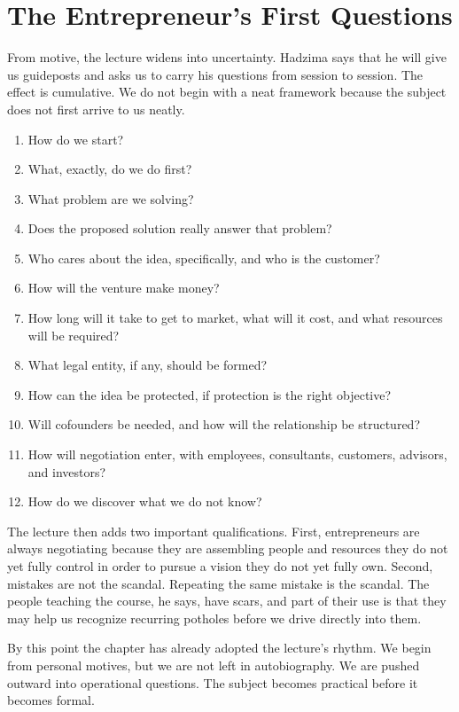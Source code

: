 \section{The Entrepreneur's First Questions}

From motive, the lecture widens into uncertainty. Hadzima says that he will give us guideposts and asks us to carry his questions from session to session. The effect is cumulative. We do not begin with a neat framework because the subject does not first arrive to us neatly.

\begin{enumerate}
  \item How do we start?
  \item What, exactly, do we do first?
  \item What problem are we solving?
  \item Does the proposed solution really answer that problem?
  \item Who cares about the idea, specifically, and who is the customer?
  \item How will the venture make money?
  \item How long will it take to get to market, what will it cost, and what resources will be required?
  \item What legal entity, if any, should be formed?
  \item How can the idea be protected, if protection is the right objective?
  \item Will cofounders be needed, and how will the relationship be structured?
  \item How will negotiation enter, with employees, consultants, customers, advisors, and investors?
  \item How do we discover what we do not know?
\end{enumerate}

The lecture then adds two important qualifications. First, entrepreneurs are always negotiating because they are assembling people and resources they do not yet fully control in order to pursue a vision they do not yet fully own. Second, mistakes are not the scandal. Repeating the same mistake is the scandal. The people teaching the course, he says, have scars, and part of their use is that they may help us recognize recurring potholes before we drive directly into them.

By this point the chapter has already adopted the lecture's rhythm. We begin from personal motives, but we are not left in autobiography. We are pushed outward into operational questions. The subject becomes practical before it becomes formal.

